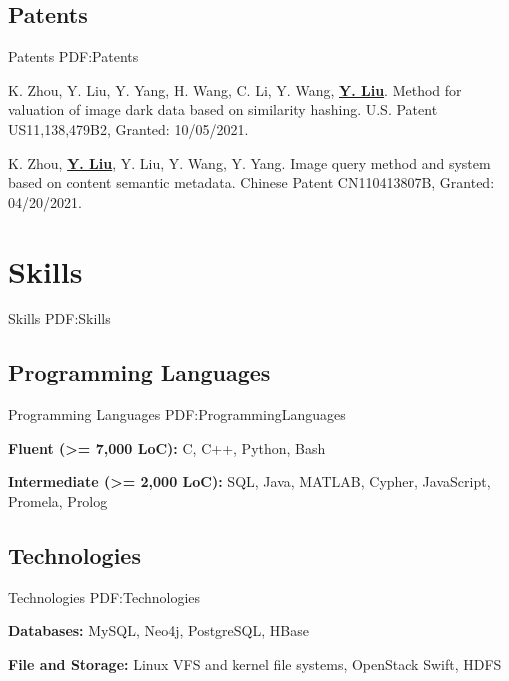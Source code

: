 \documentclass[a4paper,10pt,oneside]{article}
\begin{document}
\begin{body}
\subsection
{Patents}
{Patents}
{PDF:Patents}

\NumberedItem{[1]}
K. Zhou, Y. Liu, Y. Yang, H. Wang, C. Li, Y. Wang, \textbf{\underline{Y. Liu}}. Method for valuation of image dark data based on similarity hashing. U.S. Patent US11,138,479B2, Granted: 10/05/2021. %

\Gap

\NumberedItem{[2]}
K. Zhou, \textbf{\underline{Y. Liu}}, Y. Liu, Y. Wang, Y. Yang. Image query method and system based on content semantic metadata. Chinese Patent CN110413807B, Granted: 04/20/2021. %


\section
{Skills}
{Skills}
{PDF:Skills}

\subsection
{Programming Languages}
{Programming Languages}
{PDF:ProgrammingLanguages}

\BulletItem
\textbf{Fluent (>= 7,000 LoC):} C, C++, Python, Bash

\GapNoBreak

\BulletItem
\textbf{Intermediate (>= 2,000 LoC):} SQL, Java, MATLAB, Cypher, JavaScript, Promela, Prolog



\subsection
{Technologies}
{Technologies}
{PDF:Technologies}

\BulletItem
\textbf{Databases:} MySQL, Neo4j, PostgreSQL, HBase

\GapNoBreak

\BulletItem
\textbf{File and Storage:} Linux VFS and kernel file systems, OpenStack Swift, HDFS


\GapNoBreak


\end{body}
\end{document}

